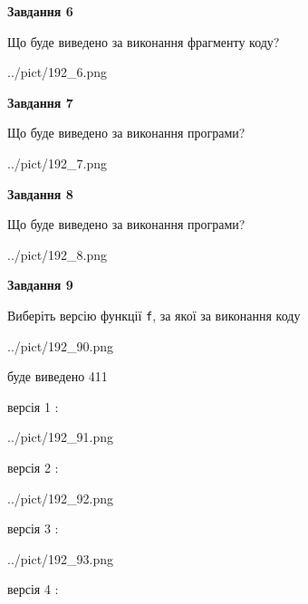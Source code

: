 \documentclass[12pt, ukrainian]{article}
\def\code#1{\Verb!#1!}
\begin{document}
{\begin {large}
{\begin {center}\textbf{Завдання 6}\end {center}}

Що буде виведено за виконання фрагменту коду?\par
\begin{center}
	{../pict/192_6.png}
\end{center}
\newpage

{\begin {center}\textbf{Завдання 7}\end {center}}

Що буде виведено за виконання програми?\par
\begin{center}
	{../pict/192_7.png}
\end{center}
\newpage

{\begin {center}\textbf{Завдання 8}\end {center}}

Що буде виведено за виконання програми?\par
\begin{center}
	{../pict/192_8.png}
\end{center}
\newpage

{\begin {center}\textbf{Завдання 9}\end {center}}

Виберіть версію функції \code{f}, за якої за виконання коду
\begin{center}
	{../pict/192_90.png}
\end{center}
буде виведено 411

\vspace{5mm}
версія 1 :

\begin{center}
	{../pict/192_91.png}
\end{center}
версія 2 :

\begin{center}
	{../pict/192_92.png}
\end{center}
версія 3 :

\begin{center}
	{../pict/192_93.png}
\end{center}
версія 4 :


\end{large}}
\end{document}

